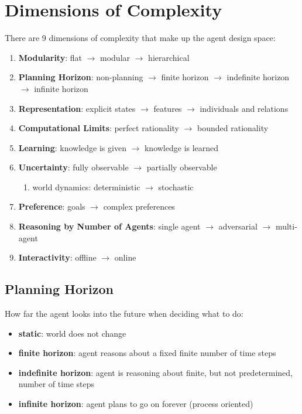 \documentclass[11pt]{article}
\begin{document}
\section{Dimensions of Complexity}
\label{sec:org84a73a7}
There are 9 dimensions of complexity that make up the agent design space:
\begin{enumerate}
\item \textbf{Modularity}: flat \(\to\) modular \(\to\) hierarchical
\item \textbf{Planning Horizon}: non-planning \(\to\) finite horizon \(\to\) indefinite horizon \(\to\) infinite horizon
\item \textbf{Representation}: explicit states \(\to\) features \(\to\) individuals and relations
\item \textbf{Computational Limits}: perfect rationality \(\to\) bounded rationality
\item \textbf{Learning}: knowledge is given \(\to\) knowledge is learned
\item \textbf{Uncertainty}: fully observable \(\to\) partially observable
\begin{enumerate}
\item world dynamics: deterministic \(\to\) stochastic
\end{enumerate}
\item \textbf{Preference}: goals \(\to\) complex preferences
\item \textbf{Reasoning by Number of Agents}: single agent \(\to\) adversarial \(\to\) multi-agent
\item \textbf{Interactivity}: offline \(\to\) online
\end{enumerate}
\subsection{Planning Horizon}
\label{sec:org2926b46}
How far the agent looks into the future when deciding what to do:
\begin{itemize}
\item \textbf{static}: world does not change
\item \textbf{finite horizon}: agent reasons about a fixed finite number of time steps
\item \textbf{indefinite horizon}: agent is reasoning about finite, but not predetermined, number of time steps
\item \textbf{infinite horizon}: agent plans to go on forever (process oriented)
\end{itemize}
\end{document}

